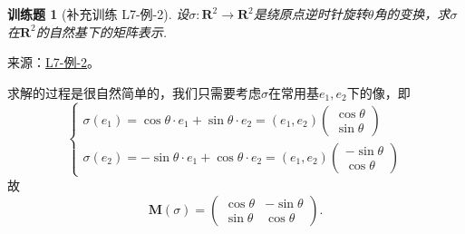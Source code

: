\documentclass[12pt,fontset=fandol]{ctexart}
\newtheorem{exercise}{训练题}[section]
\begin{document}
\begin{exercise}[补充训练 L7-例-2]\label{prob:L7-例-2}
设$\sigma\colon\mathbf{R}^2\to\mathbf{R}^2$是绕原点逆时针旋转$\theta$角的变换，求$\sigma$在$\mathbf{R}^2$的自然基下的矩阵表示.
\end{exercise}
\noindent 来源：\href{https://github.com/yhwu-is/Linear-Algebra-Left-Undone/blob/new/%E8%AE%B2%E4%B9%89/%E4%B8%93%E9%A2%98/7%20%E7%BA%BF%E6%80%A7%E6%98%A0%E5%B0%84%E7%9F%A9%E9%98%B5%E8%A1%A8%E7%A4%BA%E4%B8%8E%E7%9F%A9%E9%98%B5%E8%BF%90%E7%AE%97%E5%9F%BA%E7%A1%80.tex}{L7-例-2}。
\begin{solve}
求解的过程是很自然简单的，我们只需要考虑$\sigma$在常用基$e_1,e_2$下的像，即
    \[
    \begin{cases}
        \sigma(e_1)=\cos\theta\cdot e_1+\sin\theta\cdot e_2=(e_1,e_2)\begin{pmatrix}
            \cos\theta \\ \sin\theta
        \end{pmatrix} \\
        \sigma(e_2)=-\sin\theta\cdot e_1+\cos\theta\cdot e_2=(e_1,e_2)\begin{pmatrix}
            -\sin\theta \\ \cos\theta
        \end{pmatrix}
    \end{cases}
    \]
    故
    \[\mathbf{M}(\sigma)=\begin{pmatrix}
        \cos\theta & -\sin\theta \\
        \sin\theta & \cos\theta
    \end{pmatrix}.\]
\end{solve}
\end{document}
